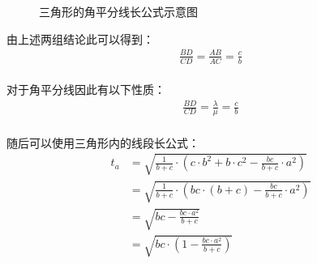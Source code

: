 \documentclass[UTF8]{ctexart}
\begin{document}
    \begin{figure}[h!]
        \begin{center}
            \caption{三角形的角平分线长公式示意图}
        \end{center}
    \end{figure}

\newpage

    由上述两组结论此可以得到：
    \begin{align}
        \frac{BD}{CD}=\frac{AB}{AC}=\frac{c}{b}
    \end{align}\\
    对于角平分线因此有以下性质：
    \begin{align}
        \frac{BD}{CD}=\frac{\lambda}{\mu}=\frac{c}{b}
    \end{align}\\
    随后可以使用三角形内的线段长公式：\vspace{8pt}
    \begin{align}
        t_a
        &=\sqrt{\frac{1}{b+c}\cdot\left(c\cdot b^2+b\cdot c^2-\frac{bc}{b+c}\cdot a^2\right)}\\[3mm]
        &=\sqrt{\frac{1}{b+c}\cdot\left(bc\cdot(b+c)-\frac{bc}{b+c}\cdot a^2\right)}\\[3mm]
        &=\sqrt{bc-\frac{bc\cdot a^2}{b+c}}\\[3mm]
        &=\sqrt{bc\cdot\left(1-\frac{bc\cdot a^2}{b+c}\right)}
    \end{align}\\
\end{document}
